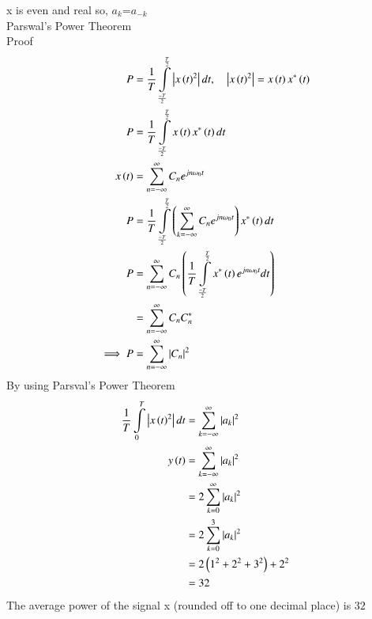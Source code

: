 \documentclass[a4,12pt,onecolumn]{IEEEtran}
\begin{document}
x is even and real so, $a_k$=$a_{-k}$\\
Parswal's Power Theorem\\
Proof
\begin{align}
P&=\frac{1}{T}\int\limits_{\frac{-T}{2}}^{\frac{T}{2}}\left| x\left(t\right)^2 \right|dt ,\quad{\left| x\ensuremath{\left(t\right)}^2 \right|=x\ensuremath{\left(t\right)}x^*\ensuremath{\left(t\right)}}\\
P&=\frac{1}{T}\int\limits_{\frac{-T}{2}}^{\frac{T}{2}}x\left(t\right)x^*\left(t\right)dt \\
x\left(t\right)&=\sum\limits_{n=-\infty}^{\infty}C_ne^{jn\omega_0t}\\
P&=\frac{1}{T}\int\limits_{\frac{-T}{2}}^{\frac{T}{2}}\left(\sum\limits_{k=-\infty}^{\infty}C_ne^{jn\omega_0t}\right)x^*\left(t\right)dt\\
P&=\sum\limits_{n=-\infty}^{\infty}C_n\left(\frac{1}{T}\int\limits_{\frac{-T}{2}}^{\frac{T}{2}}x^*\left(t\right)e^{jn\omega_0t}dt\right)\\
&=\sum\limits_{n=-\infty}^{\infty}C_nC^*_n\\
\implies P&=\sum\limits_{n=-\infty}^{\infty}\left| C_n \right|^2
\end{align}
By using Parsval's Power Theorem
\begin{align}
\frac{1}{T}\int\limits_{0}^{T}\left| x\left(t\right)^2 \right|dt&=\sum\limits_{k=-\infty}^{\infty}\left| a_k \right|^2\\
y\left(t\right)&=\sum\limits_{k=-\infty}^{\infty}\left| a_k \right|^2\\
&=2\sum\limits_{k=0}^{\infty}\left| a_k \right|^2\\
&=2\sum\limits_{k=0}^{3}\left| a_k \right|^2\\
&=2\left(1^2+2^2+3^2\right)+2^2\\
&=32\\
\end{align}
The average power of the signal x (rounded off to one decimal place) is $32$
\end{document}
